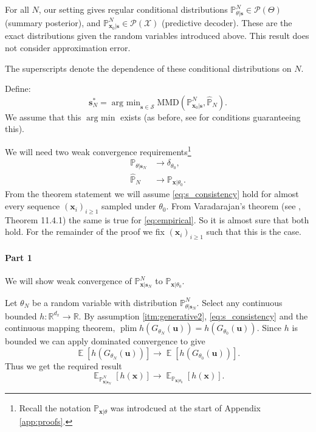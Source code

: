 \documentclass{article}
\theoremstyle{plain}
\theoremstyle{definition}
\theoremstyle{remark}
\DeclareMathOperator*{\argmin}{arg\ min}
\DeclareMathOperator*{\E}{\mathbb{E}}
\DeclareMathOperator*{\plim}{plim}
\begin{document}
For all $N$, our setting gives regular conditional distributions $\mathbb{P}^N_{\theta|\mathbf{s}} \in \mathcal{P}(\Theta)$ (summary posterior), and $\mathbb{P}^N_{\mathbf{x}_0 | \mathbf{s}} \in \mathcal{P}(\mathcal{X})$ (predictive decoder). These are the exact distributions given the random variables introduced above. This result does not consider approximation error.

The superscripts denote the dependence of these conditional distributions on $N$.

Define:
\[
\mathbf{s}_N^* = \argmin_{\mathbf{s} \in \mathcal{S}}
\mathrm{MMD}(\mathbb{P}^N_{\mathbf{x}_0 | \mathbf{s}}, \hat{\mathbb{P}}_N).
\]
We assume that this $\argmin$ exists
(as before, see \citet{briolStatisticalInferenceGenerative2019b} for conditions guaranteeing this).

We will need two weak convergence requirements\footnote{
  Recall the notation $\mathbb{P}_{\mathbf{x}|\theta}$ was introdcued at the start of Appendix \ref{app:proofs}.
}
\begin{align} 
\mathbb{P}_{\theta | \mathbf{s}_N} &\to \delta_{\theta_0}, \label{eq:s_consistency} \\
\hat{\mathbb{P}}_N &\to \mathbb{P}_{\mathbf{x}|\theta_0}. \label{eq:empirical}
\end{align}
From the theorem statement we will assume \eqref{eq:s_consistency} hold for almost every sequence $(\mathbf{x}_i)_{i \geq 1}$ sampled under $\theta_0$.
From Varadarajan's theorem (see \citealp{dudleyRealAnalysisProbability2018}, Theorem 11.4.1) the same is true for \eqref{eq:empirical}.
So it is almost sure that both hold.
For the remainder of the proof we fix $(\mathbf{x}_i)_{i \geq 1}$ such that this is the case.

\paragraph{Part 1}
We will show weak convergence of $\mathbb{P}^N_{\mathbf{x}|\mathbf{s}_N}$ to $\mathbb{P}_{\mathbf{x}|\theta_0}$.

Let $\theta_N$ be a random variable with distribution $\mathbb{P}^N_{\theta | \mathbf{s}_N}$.
Select any continuous bounded $h: \mathbb{R}^{d_x} \to \mathbb{R}$.
By assumption \ref{itm:generative2}, \eqref{eq:s_consistency} and the continuous mapping theorem,
$\plim h(G_{\theta_N}(\mathbf{u})) = h(G_{\theta_0}(\mathbf{u}))$.
Since $h$ is bounded we can apply dominated convergence to give
\[
\E[ h(G_{\theta_N}(\mathbf{u})) ] \to \E[ h(G_{\theta_0}(\mathbf{u})) ].
\]
Thus we get the required result
\[
\E_{\mathbb{P}^N_{\mathbf{x}|\mathbf{s}_N}}[ h(\mathbf{x}) ] \to
\E_{\mathbb{P}_{\mathbf{x}|\theta_0}}[ h(\mathbf{x}) ].
\]
\end{document}
